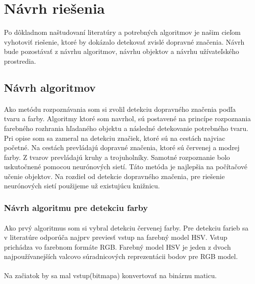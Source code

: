 \documentclass[12pt]{article}
\begin{document}
\section{Návrh riešenia}
\paragraph{}
Po dôkladnom naštudovaní literatúry a potrebných algoritmov je našim cieľom vyhotoviť riešenie, ktoré by dokázalo detekovať zvislé dopravné značenia.
Návrh bude pozostávať z návrhu algoritmov, návrhu objektov a návrhu užívateľského prostredia.
\subsection{Návrh algoritmov}
\paragraph{}
Ako metódu rozpoznávania som si zvolil detekciu dopravného značenia podľa tvaru a farby. 
Algoritmy ktoré som navrhol, sú postavené na princípe rozpoznania farebného rozhrania hľadaného objektu a následné detekovanie potrebného tvaru.
Pri opise som sa zameral na detekciu značiek, ktoré sú na cestách najviac početné.
Na cestách prevládajú dopravné značenia, ktoré sú červenej a modrej farby. Z tvarov prevládajú kruhy a trojuholníky.
Samotné rozpoznanie bolo uskutočnené pomocou neurónových sietí. Táto metóda je najlepšia na počítačové učenie objektov.
Na rozdiel od detekcie dopravného značenia, pre riešenie neurónových sietí použijeme už existujúcu knižnicu.
\subsubsection{Návrh algoritmu pre detekciu farby}
\paragraph{}
Ako prvý algoritmus som si vybral detekciu červenej farby. Pre detekciu farieb sa v literatúre odporúča najprv previesť vstup na farebný model HSV. 
Vstup prichádza vo farebnom formáte RGB. Farebný model HSV je jeden z dvoch najpoužívanejších valcovo súradnicových reprezentácii bodov pre RGB model.
\cite{hsl_hsv_wiki_en}
\paragraph{}
Na začiatok by sa mal vstup(bitmapa) konvertovať na binárnu maticu.
\end{document}
